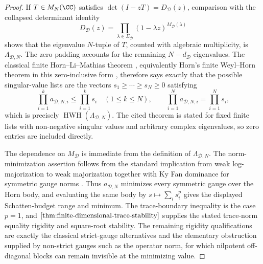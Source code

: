 \begin{proof}
  If \(T\in M_N(\CC)\) satisfies \(\det(I-zT)=D_{\mathcal D}(z)\), comparison
  with the collapsed determinant identity
  \[
    D_{\mathcal D}(z)=\prod_{\lambda\in\Sigma_{\mathcal D}}
      (1-\lambda z)^{M_{\mathcal D}(\lambda)}
  \]
  shows that the eigenvalue \(N\)-tuple of \(T\), counted with algebraic
  multiplicity, is \(\Lambda_{\mathcal D,N}\).  The zero padding accounts for
  the remaining \(N-d_{\mathcal D}\) eigenvalues.  The classical finite
  Horn--Li--Mathias theorem
  \cite[Theorem~1.1]{LiMathias2001Construction}, equivalently Horn's finite
  Weyl--Horn theorem in this zero-inclusive form
  \cite[Theorem~1]{Horn1954DoublyStochastic}, therefore says exactly that the
  possible singular-value lists are the vectors
  \(s_1\ge\cdots\ge s_N\ge0\) satisfying
  \[
    \prod_{i=1}^k a_{\mathcal D,N,i}
    \le \prod_{i=1}^k s_i\quad(1\le k\le N),
    \qquad
    \prod_{i=1}^N a_{\mathcal D,N,i}=
    \prod_{i=1}^N s_i,
  \]
  which is precisely \(\operatorname{HWH}(\Lambda_{\mathcal D,N})\).  The cited
  theorem is stated for fixed finite lists with non-negative singular values and
  arbitrary complex eigenvalues, so zero entries are included directly.

  The dependence on \(M_{\mathcal D}\) is immediate from the definition of
  \(\Lambda_{\mathcal D,N}\).  The norm-minimization assertion follows from the
  standard implication from weak log-majorization to weak majorization together
  with Ky Fan dominance for symmetric gauge norms
  \cite[Chapter~II]{Bhatia1997MatrixAnalysis}.  Thus
  \(a_{\mathcal D,N}\) minimizes every symmetric gauge over the Horn body, and
  evaluating the same body by \(s\mapsto\sum_i s_i^p\) gives the displayed
  Schatten-budget range and minimum.  The trace-boundary inequality is the
  case \(p=1\), and \(\Cref{thm:finite-dimensional-trace-stability}\) supplies
  the stated trace-norm equality rigidity and square-root stability.  The
  remaining rigidity qualifications are exactly the classical strict-gauge
  alternatives and the elementary obstruction supplied by non-strict gauges
  such as the operator norm, for which nilpotent off-diagonal blocks can remain
  invisible at the minimizing value.
\end{proof}

